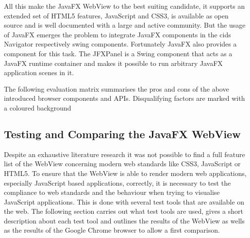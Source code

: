 All this make the JavaFX WebView to the best suiting candidate, it supports an extended set of HTML5 features, JavaScript and CSS3, is available as open source and is well documented with a large and active community.
But the usage of JavaFX emerges the problem to integrate JavaFX components in the cids Navigator respectively swing components.
Fortunately JavaFX also provides a component for this task.
The JFXPanel is a Swing component that acts as a JavaFX runtime container and makes it possible to run arbitrary JavaFX application scenes in it.
 

The following evaluation matrix summarises the pros and cons of the above introduced browser components and APIs. Disqualifying factors are marked with a coloured background



\subsection{Testing and Comparing the JavaFX WebView}\label{chap:browser_api_testing}

Despite an exhaustive literature research it was not possible to find a full feature list of the WebView concerning modern web standards like CSS3, JavaScript or HTML5.
To ensure that the WebView is able to render modern web applications, especially JavaScript based applications, correctly, it is necessary to test the compliance to web standards and the behaviour when trying to visualise JavaScript applications.
This is done with several test tools that are available on the web.
The following section carries out what test tools are used, gives a short description about each test tool and outlines the results of the WebView as wells as the results of the Google Chrome browser to allow a first comparison.


